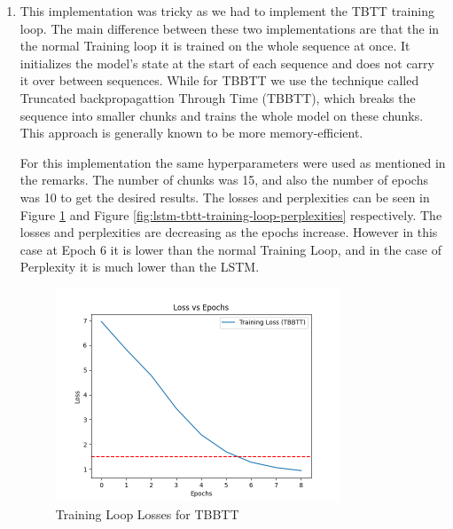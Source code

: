 \documentclass[a4paper]{article}
\begin{document}
\begin{enumerate}
          As it can be seen from the Figure \ref{fig:lstm-training-loop-losses} and Figure \ref{fig:lstm-training-loop-perplexities} that the losses and perplexities are decreasing as the epochs increase. The lose has also decreased bellow 1.5 as required and was also early stopped at epoch 6 to save time and computation power.

          Also the perplexity is also decreasing as the epochs increase and is also below 4 which indicates that the model is learning well. The sentences were also generated in different stages. Each sentence started with trump. The sentence generated at epoch 1 was \textit{trump to the the the the}. The sentence generated at epoch 3 was \textit{trump think elections}. Lastly the sentence generated at epoch 6 was \textit{trump to announce \$1 sanctions}.

    \item This implementation was tricky as we had to implement the TBTT training loop. The main difference between these two implementations are that the in the normal Training loop it is trained on the whole sequence at once. It initializes the model's state at the start of each sequence and does not carry it over between sequences. While for TBBTT we use the technique called Truncated backpropagattion Through Time (TBBTT), which breaks the sequence into smaller chunks and trains the whole model on these chunks. This approach is generally known to be more memory-efficient.

          For this implementation the same hyperparameters were used as mentioned in the remarks. The number of chunks was 15, and also the number of epochs was 10 to get the desired results. The losses and perplexities can be seen in Figure \ref{fig:lstm-tbtt-training-loop-losses} and Figure \ref{fig:lstm-tbtt-training-loop-perplexities} respectively. The losses and perplexities are decreasing as the epochs increase. However in this case at Epoch 6 it is lower than the normal Training Loop, and in the case of Perplexity it is much lower than the LSTM.
          \begin{figure}[H]
              \centering
              \includegraphics[width=0.8\textwidth]{"./plots/TBBTT-training-loop-losses.png"}
              \caption{Training Loop Losses for TBBTT}
              \label{fig:lstm-tbtt-training-loop-losses}
          \end{figure}


\end{enumerate}
\end{document}
